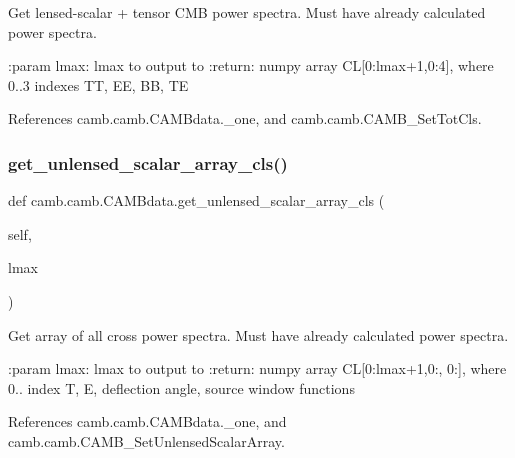\begin{DoxyVerb}Get lensed-scalar + tensor CMB power spectra. Must have already calculated power spectra.

:param lmax: lmax to output to
:return: numpy array CL[0:lmax+1,0:4], where 0..3 indexes TT, EE, BB, TE
\end{DoxyVerb}
 

References camb.\+camb.\+C\+A\+M\+Bdata.\+\_\+one, and camb.\+camb.\+C\+A\+M\+B\+\_\+\+Set\+Tot\+Cls.

\mbox{\label{classcamb_1_1camb_1_1CAMBdata_a430cc8ae7b233dfb8a36f99882d32377}} 
\subsubsection{\texorpdfstring{get\+\_\+unlensed\+\_\+scalar\+\_\+array\+\_\+cls()}{get\_unlensed\_scalar\_array\_cls()}}
{\footnotesize\ttfamily def camb.\+camb.\+C\+A\+M\+Bdata.\+get\+\_\+unlensed\+\_\+scalar\+\_\+array\+\_\+cls (\begin{DoxyParamCaption}\item[{}]{self,  }\item[{}]{lmax }\end{DoxyParamCaption})}

\begin{DoxyVerb}Get array of all cross power spectra. Must have already calculated power spectra.

:param lmax: lmax to output to
:return: numpy array CL[0:lmax+1,0:, 0:], where 0.. index T, E, deflection angle, source window functions
\end{DoxyVerb}
 

References camb.\+camb.\+C\+A\+M\+Bdata.\+\_\+one, and camb.\+camb.\+C\+A\+M\+B\+\_\+\+Set\+Unlensed\+Scalar\+Array.

\mbox{\label{classcamb_1_1camb_1_1CAMBdata_a43faed309e32f7e4c075c0f8be5bcab8}} 
